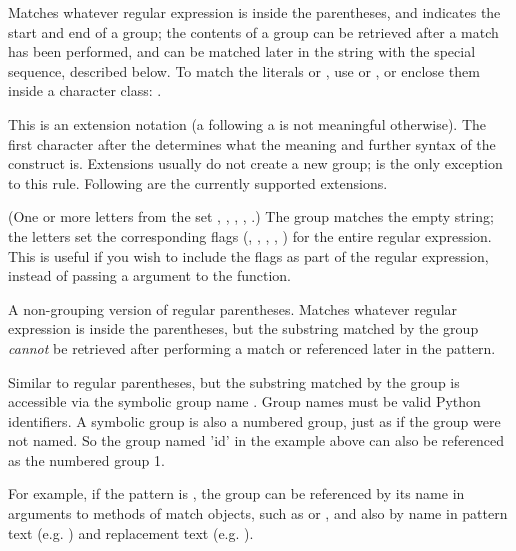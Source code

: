\begin{list}{}{\leftmargin \MyLeftMargin {} \MyLabelWidth}
\item[\code{(...)}] Matches whatever regular expression is inside the
parentheses, and indicates the start and end of a group; the contents
of a group can be retrieved after a match has been performed, and can
be matched later in the string with the  special
sequence, described below.  To match the literals \character{(} or
, use \regexp{\e(} or \regexp{\e)}, or enclose them
inside a character class: \regexp{[(] [)]}.

\item[\code{(?...)}] This is an extension notation (a 
following a \character{(} is not meaningful otherwise).  The first
character after the  
determines what the meaning and further syntax of the construct is.
Extensions usually do not create a new group;
 is the only exception to this rule.
Following are the currently supported extensions.

\item[\code{(?iLmsx)}] (One or more letters from the set ,
, , , .)  The group matches
the empty string; the letters set the corresponding flags
(, , , ,
) for the entire regular expression.  This is useful if
you wish to include the flags as part of the regular expression, instead
of passing a  argument to the  function. 

\item[\code{(?:...)}] A non-grouping version of regular parentheses.
Matches whatever regular expression is inside the parentheses, but the
substring matched by the 
group \emph{cannot} be retrieved after performing a match or
referenced later in the pattern. 

\item[\code{(?P<\var{name}>...)}] Similar to regular parentheses, but
the substring matched by the group is accessible via the symbolic group
name .  Group names must be valid Python identifiers.  A
symbolic group is also a numbered group, just as if the group were not
named.  So the group named 'id' in the example above can also be
referenced as the numbered group 1.

For example, if the pattern is
, the group can be referenced by its
name in arguments to methods of match objects, such as 
or , and also by name in pattern text
(e.g. ) and replacement text (e.g. ).


\end{list}
